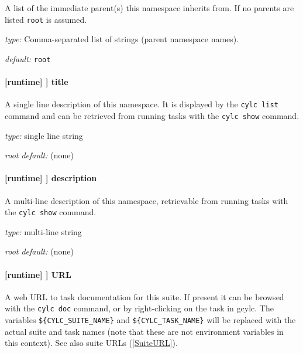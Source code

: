 A list of the immediate parent(s) this namespace inherits from. If no
parents are listed \lstinline=root= is assumed.

\begin{myitemize}
\item {\em type:} Comma-separated list of strings (parent namespace names).
\item {\em default:} \lstinline=root=
\end{myitemize}

\paragraph[title]{[runtime] \textrightarrow [[\_\_NAME\_\_]] \textrightarrow title}

A single line description of this namespace. It is displayed by the
\lstinline=cylc list= command and can be retrieved from running tasks
with the \lstinline=cylc show= command.

\begin{myitemize}
\item {\em type:} single line string
\item {\em root default:} (none)
\end{myitemize}

\paragraph[description]{[runtime] \textrightarrow [[\_\_NAME\_\_]] \textrightarrow description}

A multi-line description of this namespace, retrievable from running tasks with the
\lstinline=cylc show= command.

\begin{myitemize}
\item {\em type:} multi-line string
\item {\em root default:} (none)
\end{myitemize}

\paragraph[URL]{[runtime] \textrightarrow [[\_\_NAME\_\_]] \textrightarrow URL}
\label{TaskURL}

A web URL to task documentation for this suite.  If present it can be browsed
with the \lstinline=cylc doc= command, or by right-clicking on the task in
gcylc.  The variables \lstinline=${CYLC_SUITE_NAME}= and
\lstinline=${CYLC_TASK_NAME}= will be replaced with the actual suite and task
names (note that these are not environment variables in this context). See also
suite URLs (\ref{SuiteURL}).


